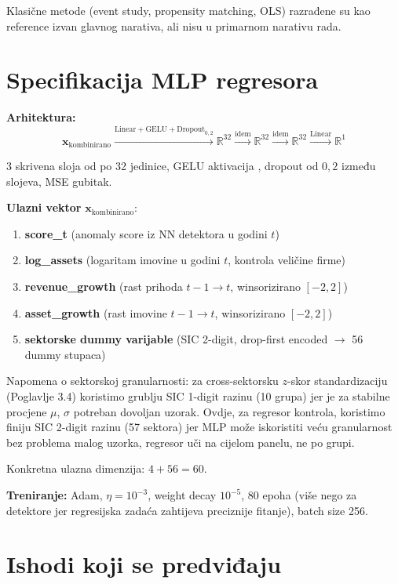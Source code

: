 \documentclass[diplomskirad,authoryear]{fer}
\begin{document}
Klasične metode (event study, propensity matching, OLS) razrađene su kao reference izvan glavnog narativa, ali nisu u primarnom narativu rada.

\section{Specifikacija MLP regresora}

\textbf{Arhitektura:}
\begin{equation}
\mathbf{x}_{\text{kombinirano}} \xrightarrow{\text{Linear}+\text{GELU}+\text{Dropout}_{0{,}2}} \mathbb{R}^{32} \xrightarrow{\text{idem}} \mathbb{R}^{32} \xrightarrow{\text{idem}} \mathbb{R}^{32} \xrightarrow{\text{Linear}} \mathbb{R}^{1}
\end{equation}

3 skrivena sloja od po 32 jedinice, GELU aktivacija \citep{hendrycks2016}, dropout od $0{,}2$ između slojeva, MSE gubitak.

\textbf{Ulazni vektor} $\mathbf{x}_{\text{kombinirano}}$:
\begin{enumerate}
 \item \textbf{score\_t} (anomaly score iz NN detektora u godini $t$)
 \item \textbf{log\_assets} (logaritam imovine u godini $t$, kontrola veličine firme)
 \item \textbf{revenue\_growth} (rast prihoda $t-1 \to t$, winsorizirano $[-2, 2]$)
 \item \textbf{asset\_growth} (rast imovine $t-1 \to t$, winsorizirano $[-2, 2]$)
 \item \textbf{sektorske dummy varijable} (SIC 2-digit, drop-first encoded $\to$ 56 dummy stupaca)
\end{enumerate}

Napomena o sektorskoj granularnosti: za cross-sektorsku $z$-skor standardizaciju (Poglavlje 3.4) koristimo grublju SIC 1-digit razinu (10 grupa) jer je za stabilne procjene $\mu$, $\sigma$ potreban dovoljan uzorak. Ovdje, za regresor kontrola, koristimo finiju SIC 2-digit razinu (57 sektora) jer MLP može iskoristiti veću granularnost bez problema malog uzorka, regresor uči na cijelom panelu, ne po grupi.

Konkretna ulazna dimenzija: $4 + 56 = 60$.

\textbf{Treniranje:} Adam, $\eta = 10^{-3}$, weight decay $10^{-5}$, 80 epoha (više nego za detektore jer regresijska zadaća zahtijeva preciznije fitanje), batch size 256.

\section{Ishodi koji se predviđaju}
\end{document}

